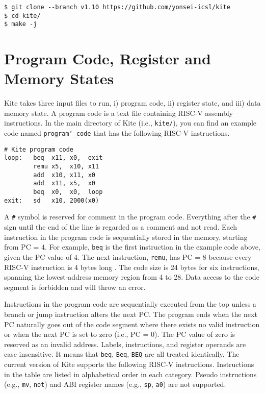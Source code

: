 \documentclass[10pt]{article}
\begin{document}
\begin{Verbatim}[frame=single]
$ git clone --branch v1.10 https://github.com/yonsei-icsl/kite
$ cd kite/
$ make -j
\end{Verbatim}


\section{Program Code, Register and Memory States} \label{sec:inputs}
Kite takes three input files to run, i) program code, ii) register state, and iii) data memory state.
A program code is a text file containing RISC-V assembly instructions.
In the main directory of Kite (i.e., {\tt kite/}), you can find an example code named {\tt program\char`_code} that has the following RISC-V instructions.

\begin{Verbatim}[frame=single]
# Kite program code
loop:   beq  x11, x0,  exit
        remu x5,  x10, x11
        add  x10, x11, x0
        add  x11, x5,  x0
        beq  x0,  x0,  loop
exit:   sd   x10, 2000(x0)
\end{Verbatim}

A {\tt \#} symbol is reserved for comment in the program code.
Everything after the {\tt \#} sign until the end of the line is regarded as a comment and not read.
Each instruction in the program code is sequentially stored in the memory, starting from PC = 4.
For example, {\tt beq} is the first instruction in the example code above, given the PC value of 4.
The next instruction, {\tt remu}, has PC = 8 because every RISC-V instruction is 4 bytes long \cite{waterman_riscv2019}.
The code size is 24 bytes for six instructions, spanning the lowest-address memory region from 4 to 28.
Data access to the code segment is forbidden and will throw an error.

Instructions in the program code are sequentially executed from the top unless a branch or jump instruction alters the next PC.
The program ends when the next PC naturally goes out of the code segment where there exists no valid instruction or when the next PC is set to zero (i.e., PC = 0).
The PC value of zero is reserved as an invalid address.
Labels, instructions, and register operands are case-insensitive.
It means that {\tt beq}, {\tt Beq}, {\tt BEQ} are all treated identically.
The current version of Kite supports the following RISC-V instructions.
Instructions in the table are listed in alphabetical order in each category.
Pseudo instructions (e.g., {\tt mv}, {\tt not}) and ABI register names (e.g., {\tt sp}, {\tt a0}) are not supported.
\end{document}
